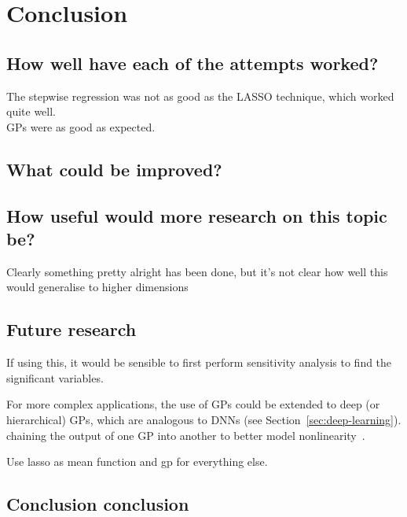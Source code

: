 
\chapter{Conclusion}

\section{How well have each of the attempts worked?}

\begin{todo}
	The stepwise regression was not as good as the LASSO technique, which worked quite well. \\
	GPs were as good as expected.
\end{todo}

\section{What could be improved?}

\section{How useful would more research on this topic be?}

\begin{todo}
	Clearly something pretty alright has been done, but it's not clear how well this would generalise to higher dimensions
\end{todo}

\section{Future research}

If using this, it would be sensible to first perform sensitivity analysis to find the significant variables.

For more complex applications, the use of \acp{GP} could be extended to deep (or hierarchical) \acp{GP}, which are analogous to \acp{DNN} (see Section~\ref{sec:deep-learning}).
 chaining the output of one \ac{GP} into another to better model nonlinearity~\autocite{damianou2013}.

Use lasso as mean function and gp for everything else.

\section{Conclusion conclusion}

